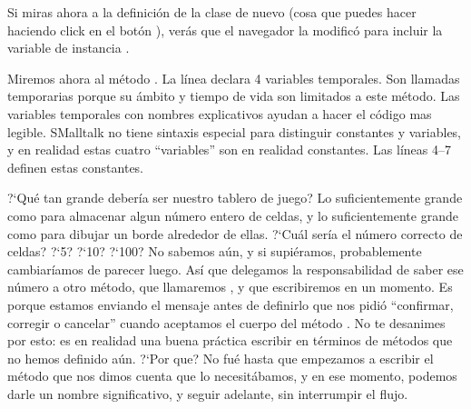 \documentclass[a4paper,10pt,twoside]{book}
\begin{document}
Si miras ahora a la definici\'on de la clase de nuevo (cosa que puedes hacer haciendo click en el bot\'on ), ver\'as que el navegador la modific\'o para incluir la variable de instancia .

Miremos ahora al m\'etodo .
La l\'inea  declara 4 variables temporales. Son llamadas temporarias porque su \'ambito y tiempo de vida son limitados a este m\'etodo. Las variables temporales con nombres explicativos ayudan a hacer el c\'odigo mas legible. SMalltalk no tiene sintaxis especial para distinguir constantes y variables, y en realidad estas cuatro ``variables'' son en realidad constantes.
Las l\'ineas 4--7 definen estas constantes.

?`Qu\'e tan grande deber\'ia ser nuestro tablero de juego? Lo suficientemente grande como para almacenar algun n\'umero entero de celdas, y lo suficientemente grande como para dibujar un borde alrededor de ellas.
?`Cu\'al ser\'ia el n\'umero correcto de celdas? ?`5? ?`10? ?`100? No sabemos a\'un, y si supi\'eramos, probablemente cambiar\'iamos de parecer luego. As\'i que delegamos la responsabilidad de saber ese n\'umero a otro m\'etodo, que llamaremos , y que escribiremos en un momento.
Es porque estamos enviando el mensaje  antes de definirlo que \pharo nos pidi\'o ``confirmar, corregir o cancelar'' cuando aceptamos el cuerpo del m\'etodo .
No te desanimes por esto: es en realidad una buena pr\'actica escribir en t\'erminos de m\'etodos que no hemos definido a\'un.
?`Por que? No fu\'e hasta que empezamos a escribir el m\'etodo  que nos dimos cuenta que lo necesit\'abamos, y en ese momento, podemos darle un nombre significativo, y seguir adelante, sin interrumpir el flujo.
 
\end{document}
